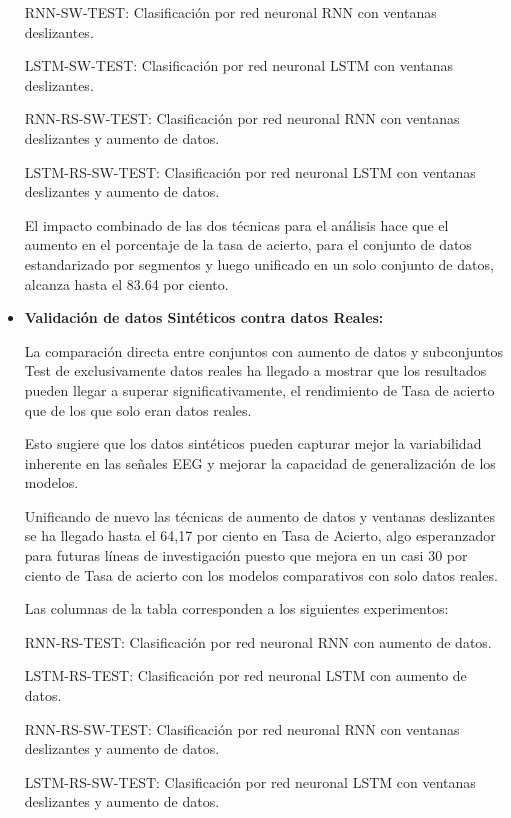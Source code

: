 \begin{itemize}
	RNN-SW-TEST: Clasificación por red neuronal RNN con ventanas deslizantes.

	LSTM-SW-TEST: Clasificación por red neuronal LSTM con ventanas deslizantes.

	RNN-RS-SW-TEST: Clasificación por red neuronal RNN con ventanas deslizantes y aumento de datos.

	LSTM-RS-SW-TEST: Clasificación por red neuronal LSTM con ventanas deslizantes y aumento de datos.

	
	El impacto combinado de las dos técnicas para el análisis hace que el aumento en el porcentaje de la tasa de acierto, para el conjunto de datos estandarizado por segmentos y luego unificado en un solo conjunto de datos, alcanza hasta el 83.64 por ciento.
	
	
	\item
	\textbf{Validación de datos Sintéticos contra datos Reales:}


	La comparación directa entre conjuntos con aumento de datos y subconjuntos Test de exclusivamente datos reales ha llegado a mostrar que los resultados  pueden llegar a superar significativamente, el rendimiento de Tasa de acierto que de los que solo eran datos reales. 
	
	Esto sugiere que los datos sintéticos pueden capturar mejor la variabilidad inherente en las señales EEG y mejorar la capacidad de generalización de los modelos.
	
	Unificando de nuevo las técnicas de aumento de datos y ventanas deslizantes se ha llegado hasta el 64,17 por ciento en Tasa de Acierto, algo esperanzador para futuras líneas de investigación puesto que mejora en un casi 30 por ciento de Tasa de acierto con los modelos comparativos con solo datos reales.


	Las columnas de la tabla corresponden a los siguientes experimentos:

RNN-RS-TEST: Clasificación por red neuronal RNN con aumento de datos.

LSTM-RS-TEST: Clasificación por red neuronal LSTM con aumento de datos.

RNN-RS-SW-TEST: Clasificación por red neuronal RNN con ventanas deslizantes y aumento de datos.

LSTM-RS-SW-TEST: Clasificación por red neuronal LSTM con ventanas deslizantes y aumento de datos.


\end{itemize}

